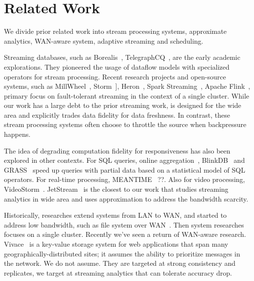 \section{Related Work}
\label{sec:related-work}

We divide prior related work into stream processing systems, approximate
analytics, WAN-aware system, adaptive streaming and scheduling.

 Streaming databases, such as
Borealis~\cite{abadi2005design},
TelegraphCQ~\cite{chandrasekaran2003telegraphcq}, are the early academic
explorations. They pioneered the usage of dataflow models with specialized
operators for stream processing. Recent research projects and open-source
systems, such as MillWheel~\cite{akidau2013millwheel},
Storm~\cite{toshniwal2014storm}], Heron~\cite{sanjeev2015twitter}, Spark
Streaming~\cite{zaharia2013discretized}, Apache Flink~\cite{carbone2015apache},
primary focus on fault-tolerant streaming in the context of a single
cluster. While our work has a large debt to the prior streaming work, \sysname{}
is designed for the wide area and explicitly trades data fidelity for data
freshness. In contrast, these stream processing systems often choose to throttle
the source when backpressure happens.

 The idea of degrading computation fidelity for
responsiveness has also been explored in other contexts. For SQL queries, online
aggregation~\cite{hellerstein1997online}, BlinkDB~\cite{agarwal2013blinkdb} and
GRASS~\cite{ananthanarayanan2014grass} speed up queries with partial data based
on a statistical model of SQL operators. For real-time processing,
MEANTIME~\cite{farrell2016meantime} ??. Also for video processing,
VideoStorm~\cite{zhang2017live}. JetStream~\cite{rabkin2014aggregation} is the
closest to our work that studies streaming analytics in wide area and uses
approximation to address the bandwidth scarcity.

 Historically, researches extend systems from LAN to WAN, and
started to address low bandwidth, such as file system over
WAN~\cite{muthitacharoen2001low}. Then system researches focuses on a single
cluster.  Recently we've seen a return of WAN-aware
research. Vivace~\cite{cho2012surviving} is a key-value storage system for web
applications that span many geographically-distributed sites; it assumes the
ability to prioritize messages in the network. We do not assume. They are
targeted at strong consistency and replicates, we target at streaming analytics
that can tolerate accuracy drop.


